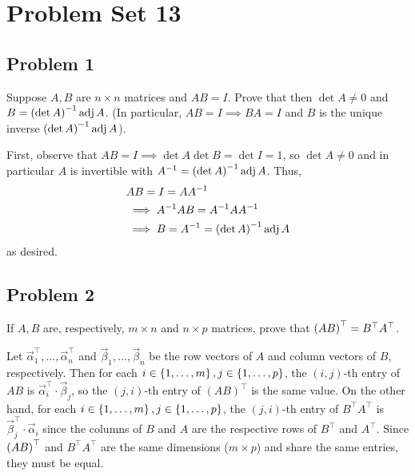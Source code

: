 \documentclass[main.tex]{subfiles}
\begin{document}
\section{Problem Set 13}
\subsection{Problem 1}
\begin{claim}
    Suppose $A, B$ are $n \times n$ matrices and $AB = I$. Prove that then $\det A \neq 0$ and $B = \left( \det A \right)^{-1}\operatorname{adj} A$. (In particular, $AB = I \implies BA = I$ and $B$ is the unique inverse $\left( \det A \right)^{-1}\operatorname{adj} A$).
\end{claim}

\begin{soln}
    First, observe that $AB = I\implies \det A\det B = \det I = 1$, so $\det A \neq 0$ and in particular $A$ is invertible with $A^{-1} = \left( \det A \right)^{-1}\operatorname{adj} A$. Thus,
    \begin{align*}
        &AB = I = AA^{-1} \\
        &\implies A^{-1}AB = A^{-1}AA^{-1} \\
        &\implies B = A^{-1} = \left( \det A \right)^{-1}\operatorname{adj} A
    \end{align*}
    as desired.
\end{soln}
\eject

\subsection{Problem 2}
\begin{claim}
    If $A, B$ are, respectively, $m \times n$ and $n \times p$ matrices, prove that $\left( AB \right)^\top = B^\top A^\top$.
\end{claim}

\begin{soln}
    Let $\vec{\alpha}_1^\top, \ldots , \vec{\alpha}_n^\top$ and $\vec{\beta}_1, \ldots , \vec{\beta}_n$ be the row vectors of $A$ and column vectors of $B$, respectively. Then for each $i\in \left\{ 1, \ldots , m \right\}, j\in \left\{ 1, \ldots , p \right\}$, the $(i, j)$-th entry of $AB$ is $\vec{\alpha}_i^\top\cdot\vec{\beta}_j$, so the $(j, i)$-th entry of $(AB)^\top$ is the same value. On the other hand, for each $i\in \left\{ 1, \ldots , m \right\}, j\in \left\{ 1, \ldots , p \right\}$, the $(j, i)$-th entry of $B^\top A^\top$ is $\vec{\beta}_j^\top\cdot \vec{\alpha}_i$ since the columns of $B$ and $A$ are the respective rows of $B^\top$ and $A^\top$. Since $\left( AB \right)^\top$ and $B^\top A^\top$ are the same dimensions ($m\times p$) and share the same entries, they must be equal.
\end{soln}
\eject
\end{document}
